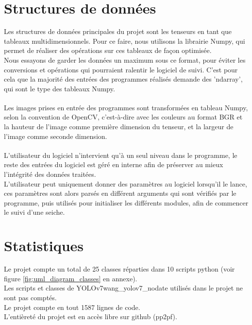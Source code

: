 \section{Structures de données}
Les structures de données principales du projet sont les tenseurs en tant que tableaux multidimensionnels. Pour ce faire, nous utilisons la librairie Numpy, qui permet de réaliser des opérations sur ces tableaux de façon optimisée.\\
Nous essayons de garder les données un maximum sous ce format, pour éviter les conversions et opérations qui pourraient ralentir le logiciel de suivi. C'est pour cela que la majorité des entrées des programmes réalisés demande des 'ndarray', qui sont le type des tableaux Numpy.\\
\\
Les images prises en entrée des programmes sont transformées en tableau Numpy, selon la convention de OpenCV, c'est-à-dire avec les couleurs au format BGR et la hauteur de l'image comme première dimension du tenseur, et la largeur de l'image comme seconde dimension.\\
\\
L'utilisateur du logiciel n'intervient qu'à un seul niveau dans le programme, le reste des entrées du logiciel est géré en interne afin de préserver au mieux l'intégrité des données traitées.\\
L'utilisateur peut uniquement donner des paramètres au logiciel lorsqu'il le lance, ces paramètres sont alors parsés en différent arguments qui sont vérifiés par le programme, puis utilisés pour initialiser les différents modules, afin de commencer le suivi d'une seiche.




\section{Statistiques}
Le projet compte un total de 25 classes réparties dans 10 scripts python (voir figure \ref{fig:uml_diagram_classes} en annexe).\\
Les scripts et classes de YOLOv7{wang_yolov7_nodate} utilisés dans le projet ne sont pas comptés.\\
Le projet compte en tout 1587 lignes de code.\\
L'entièreté du projet est en accès libre sur github ({pp2pf}).

\clearpage
